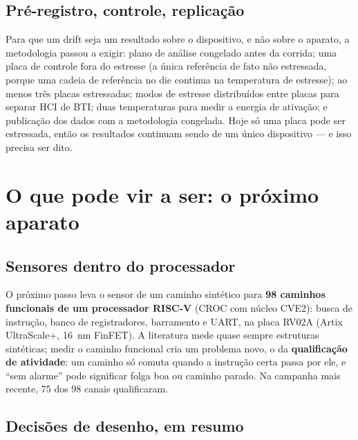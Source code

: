 \documentclass[11pt,a4paper]{article}
\begin{document}
\subsection{Pré-registro, controle, replicação}

Para que um drift seja um resultado sobre o dispositivo, e não sobre o aparato, a metodologia passou a exigir:
plano de análise congelado antes da corrida; uma placa de controle fora do estresse (a única referência de fato não
estressada, porque uma cadeia de referência no die continua na temperatura de estresse); ao menos três placas estressadas;
modos de estresse distribuídos entre placas para separar HCI de BTI; duas temperaturas para medir a energia de ativação; e
publicação dos dados com a metodologia congelada. Hoje só uma placa pode ser estressada, então os resultados continuam
sendo de um único dispositivo --- e isso precisa ser dito.

\section{O que pode vir a ser: o próximo aparato}

\subsection{Sensores dentro do processador}

O próximo passo leva o sensor de um caminho sintético para \textbf{98 caminhos funcionais de um processador RISC-V}
(CROC com núcleo CVE2): busca de instrução, banco de registradores, barramento e UART, na placa RV02A (Artix UltraScale+,
16~nm FinFET). A literatura mede quase sempre estruturas sintéticas; medir o caminho funcional cria um problema novo, o da
\textbf{qualificação de atividade}: um caminho só comuta quando a instrução certa passa por ele, e ``sem alarme'' pode
significar folga boa ou caminho parado. Na campanha mais recente, 75 dos 98 canais qualificaram.

\subsection{Decisões de desenho, em resumo}
\end{document}
